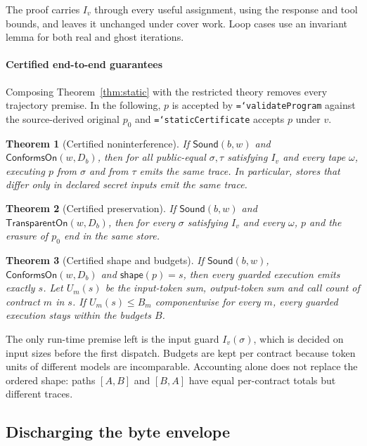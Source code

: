 \documentclass[preprint,12pt]{elsarticle}
\newtheorem{theorem}{Theorem}
\theoremstyle{definition}
\newcommand{\code}[1]{\texttt{\hyphenchar\font=`\-#1}}
\begin{document}
The proof carries $I_v$ through every useful assignment, using the response and
tool bounds, and leaves it unchanged under cover work. Loop cases use an
invariant lemma for both real and ghost iterations.

\paragraph{Certified end-to-end guarantees}
Composing Theorem~\ref{thm:static} with the restricted theory removes every
trajectory premise. In the following, $p$ is accepted by \code{validateProgram}
against the source-derived original $p_0$ and \code{staticCertificate} accepts $p$
under $v$.

\begin{theorem}[Certified noninterference]\label{thm:cert-ni}
If $\mathsf{Sound}(b,w)$ and $\mathsf{ConformsOn}(w,D_b)$, then for all
public-equal $\sigma,\tau$ satisfying $I_v$ and every tape $\omega$, executing $p$
from $\sigma$ and from $\tau$ emits the same trace. In particular, stores that
differ only in declared secret inputs emit the same trace.
\end{theorem}

\begin{theorem}[Certified preservation]\label{thm:cert-pres}
If $\mathsf{Sound}(b,w)$ and $\mathsf{TransparentOn}(w,D_b)$, then for every
$\sigma$ satisfying $I_v$ and every $\omega$, $p$ and the erasure of $p_0$ end in
the same store.
\end{theorem}

\begin{theorem}[Certified shape and budgets]\label{thm:cert-budget}
If $\mathsf{Sound}(b,w)$, $\mathsf{ConformsOn}(w,D_b)$ and
$\mathsf{shape}(p)=s$, then every guarded execution emits exactly $s$. Let $U_m(s)$
be the input-token sum, output-token sum and call count of contract $m$ in $s$.
If $U_m(s)\leq B_m$ componentwise for every $m$, every guarded execution stays
within the budgets $B$.
\end{theorem}

The only run-time premise left is the input guard $I_v(\sigma)$, which is decided
on input sizes before the first dispatch. Budgets are kept per contract because
token units of different models are incomparable. Accounting alone does not
replace the ordered shape: paths $[A,B]$ and $[B,A]$ have equal per-contract
totals but different traces.

\subsection{Discharging the byte envelope}\label{sec:discharge}
\end{document}

